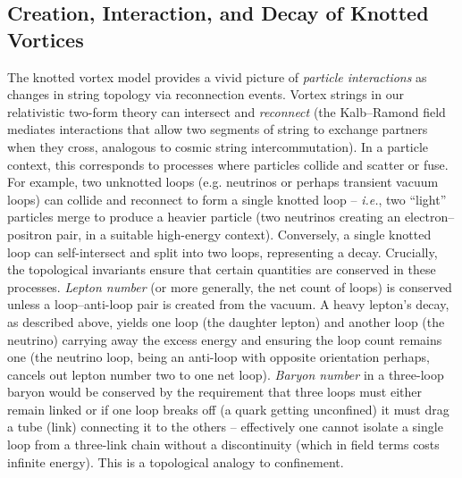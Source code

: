 \documentclass[12pt]{article}
\begin{document}
\subsection*{Creation, Interaction, and Decay of Knotted Vortices}
The knotted vortex model provides a vivid picture of \emph{particle interactions} as changes in string topology via reconnection events. Vortex strings in our relativistic two-form theory can intersect and \emph{reconnect} (the Kalb–Ramond field mediates interactions that allow two segments of string to exchange partners when they cross, analogous to cosmic string intercommutation). In a particle context, this corresponds to processes where particles collide and scatter or fuse. For example, two unknotted loops (e.g. neutrinos or perhaps transient vacuum loops) can collide and reconnect to form a single knotted loop – \emph{i.e.}, two “light” particles merge to produce a heavier particle (two neutrinos creating an electron–positron pair, in a suitable high-energy context). Conversely, a single knotted loop can self-intersect and split into two loops, representing a decay. Crucially, the topological invariants ensure that certain quantities are conserved in these processes. \emph{Lepton number} (or more generally, the net count of loops) is conserved unless a loop–anti-loop pair is created from the vacuum. A heavy lepton’s decay, as described above, yields one loop (the daughter lepton) and another loop (the neutrino) carrying away the excess energy and ensuring the loop count remains one (the neutrino loop, being an anti-loop with opposite orientation perhaps, cancels out lepton number two to one net loop). \emph{Baryon number} in a three-loop baryon would be conserved by the requirement that three loops must either remain linked or if one loop breaks off (a quark getting unconfined) it must drag a tube (link) connecting it to the others – effectively one cannot isolate a single loop from a three-link chain without a discontinuity (which in field terms costs infinite energy). This is a topological analogy to confinement.
\end{document}
